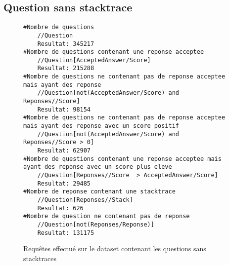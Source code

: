 \subsection{Question sans stacktrace}
\begin{figure}
\begin{lstlisting}
#Nombre de questions
    //Question
    Resultat: 345217
#Nombre de questions contenant une reponse acceptee
    //Question[AcceptedAnswer/Score]
    Resultat: 215288
#Nombre de questions ne contenant pas de reponse acceptee mais ayant des reponse
    //Question[not(AcceptedAnswer/Score) and Reponses//Score]
    Resultat: 98154
#Nombre de questions ne contenant pas de reponse acceptee mais ayant des reponse avec un score positif
    //Question[not(AcceptedAnswer/Score) and Reponses//Score > 0] 
    Resultat: 62907
#Nombre de questions contenant une reponse acceptee mais ayant des reponse avec un score plus eleve
    //Question[Reponses//Score  > AcceptedAnswer/Score]
    Resultat: 29485
#Nombre de reponse contenant une stacktrace
    //Question[Reponses//Stack]
    Resultat: 626
#Nombre de question ne contenant pas de reponse
    //Question[not(Reponses/Reponse)]
    Resultat: 131175
\end{lstlisting}
\caption{Requêtes effectué sur le dataset contenant les questions sans stacktraces}
\label{code:resultatSansStack}
\end{figure}